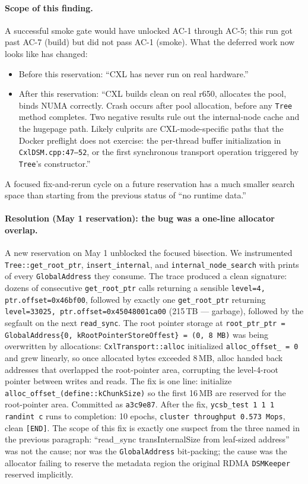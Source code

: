 \documentclass[11pt,a4paper]{article}
\begin{document}
\paragraph{Scope of this finding.} A successful smoke gate would have unlocked AC-1 through AC-5; this run got past AC-7 (build) but did not pass AC-1 (smoke). What the deferred work now looks like has changed:

\begin{itemize}[nosep]
    \item Before this reservation: ``CXL has never run on real hardware.''
    \item After this reservation: ``CXL builds clean on real r650, allocates the pool, binds NUMA correctly. Crash occurs after pool allocation, before any \texttt{Tree} method completes. Two negative results rule out the internal-node cache and the hugepage path. Likely culprits are CXL-mode-specific paths that the Docker preflight does not exercise: the per-thread buffer initialization in \texttt{CxlDSM.cpp:47--52}, or the first synchronous transport operation triggered by \texttt{Tree}'s constructor.''
\end{itemize}

A focused fix-and-rerun cycle on a future reservation has a much smaller search space than starting from the previous status of ``no runtime data.''

\paragraph{Resolution (May 1 reservation): the bug was a one-line allocator overlap.} A new reservation on May 1 unblocked the focused bisection. We instrumented \texttt{Tree::get\_root\_ptr}, \texttt{insert\_internal}, and \texttt{internal\_node\_search} with prints of every \texttt{GlobalAddress} they consume. The trace produced a clean signature: dozens of consecutive \texttt{get\_root\_ptr} calls returning a sensible \texttt{level=4, ptr.offset=0x46bf00}, followed by exactly one \texttt{get\_root\_ptr} returning \texttt{level=33025, ptr.offset=0x45048001ca00} (215\,TB --- garbage), followed by the segfault on the next \texttt{read\_sync}. The root pointer storage at \texttt{root\_ptr\_ptr = GlobalAddress\{0, kRootPointerStoreOffest\} = (0, 8\,MB)} was being overwritten by allocations: \texttt{CxlTransport::alloc} initialized \texttt{alloc\_offset\_ = 0} and grew linearly, so once allocated bytes exceeded 8\,MB, alloc handed back addresses that overlapped the root-pointer area, corrupting the level-4-root pointer between writes and reads. The fix is one line: initialize \texttt{alloc\_offset\_(define::kChunkSize)} so the first 16\,MB are reserved for the root-pointer area. Committed as \texttt{a3c9e87}. After the fix, \texttt{ycsb\_test 1 1 1 randint c} runs to completion: 10 epochs, \texttt{cluster throughput 0.573\,Mops}, clean \texttt{[END]}. The scope of this fix is exactly one suspect from the three named in the previous paragraph: ``read\_sync transInternalSize from leaf-sized address'' was not the cause; nor was the \texttt{GlobalAddress} bit-packing; the cause was the allocator failing to reserve the metadata region the original RDMA \texttt{DSMKeeper} reserved implicitly.
\end{document}
